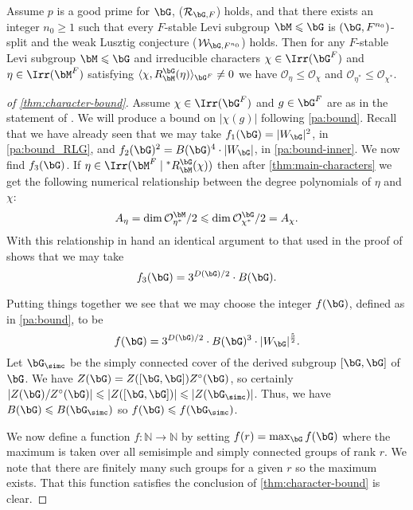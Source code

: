 \documentclass[eqthmnum,nocolour,skinny]{jt-calcs}
\begin{document}
\begin{thm}\label{thm:main-characters}
Assume $p$ is a good prime for $\bG$, ($\mathcal{R}_{\bG,F}$) holds, and that there exists an integer $n_0 \geqslant 1$ such that every $F$-stable Levi subgroup $\bM \leqslant \bG$ is $(\bG,F^{n_0})$-split and the weak Lusztig conjecture ($\mathcal{W}_{\bG,F^{n_0}}$) holds. Then for any $F$-stable Levi subgroup $\bM \leqslant \bG$ and irreducible characters $\chi \in \Irr(\bG^F)$ and $\eta \in \Irr(\bM^F)$ satisfying $\langle \chi, R_{\bM}^{\bG}(\eta)\rangle_{\bG^F} \neq 0$ we have $\mathcal{O}_{\eta} \leqslant \mathcal{O}_{\chi}$ and $\mathcal{O}_{\eta^*} \leqslant \mathcal{O}_{\chi^*}$.
\end{thm}

\begin{proof}[of \cref{thm:character-bound}]
Assume $\chi \in \Irr(\bG^F)$ and $g \in \bG^F$ are as in the statement of . We will produce a bound on $|\chi(g)|$ following \cref{pa:bound}. Recall that we have already seen that we may take $f_1(\bG) = |W_{\bG}|^2$, in \cref{pa:bound_RLG}, and $f_2(\bG)^2 = B(\bG)^4\cdot |W_{\bG}|$, in \cref{pa:bound-inner}. We now find $f_3(\bG)$. If $\eta\in \Irr(\bM^F \mid {}^*R_{\bM}^{\bG}(\chi))$ then after \cref{thm:main-characters} we get the following numerical relationship between the degree polynomials of $\eta$ and $\chi$:
\begin{equation*}
A_{\eta} = \dim \mathcal{O}_{\eta^*}^{\bM}/2 \leqslant \dim \mathcal{O}_{\chi^*}^{\bG}/2 = A_{\chi}.
\end{equation*}
With this relationship in hand an identical argument to that used in the proof of \cite[Thm.~1.1]{bezrukavnikov-liebeck-shalev-tiep:2017:character-bounds-grps-Lie-type} shows that we may take
\begin{equation*}
f_3(\bG) = 3^{D(\bG)/2} \cdot B(\bG).
\end{equation*}

Putting things together we see that we may choose the integer $f(\bG)$, defined as in \cref{pa:bound}, to be
\begin{equation*}
f(\bG) = 3^{D(\bG)/2} \cdot B(\bG)^3 \cdot |W_{\bG}|^{\frac{5}{2}}.
\end{equation*}
Let $\bG_{\simc}$ be the simply connected cover of the derived subgroup $[\bG,\bG]$ of $\bG$. We have $Z(\bG) = Z([\bG,\bG])Z^{\circ}(\bG)$, so certainly $|Z(\bG)/Z^{\circ}(\bG)| \leqslant |Z([\bG,\bG])| \leqslant |Z(\bG_{\simc})|$. Thus, we have $B(\bG) \leqslant B(\bG_{\simc})$ so $f(\bG) \leqslant f(\bG_{\simc})$.

We now define a function $f : \mathbb{N} \to \mathbb{N}$ by setting $f(r) = \max_{\bG} f(\bG)$ where the maximum is taken over all semisimple and simply connected groups of rank $r$. We note that there are finitely many such groups for a given $r$ so the maximum exists. That this function satisfies the conclusion of \cref{thm:character-bound} is clear.
\end{proof}
\end{document}

